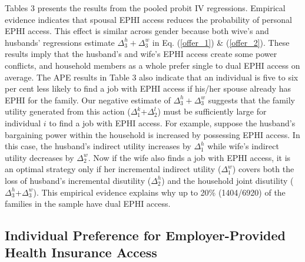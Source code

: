 \documentclass[legno,11pt]{article}
\begin{document}
Tables 3 presents the results from the pooled probit IV regressions.
Empirical evidence indicates that spousal EPHI access reduces the
probability of personal EPHI access. This effect is similar across
gender because both wive's and husbands' regressions estimate
$\Delta_{3}^{h}+\Delta_{3}^{w}$ in  Eq. (\ref{offer_1}) \&
(\ref{offer_2}). These results imply that the husband's and wife's
EPHI access create some power conflicts, and household members as a
whole prefer single to dual EPHI access on average. The APE results
in Table 3 also indicate that an individual is five to six per cent
less likely to find a job with EPHI access if his/her spouse already
has EPHI for the family. Our negative estimate of
$\Delta_{3}^{h}+\Delta_{3}^{w}$ suggests that the family utility
generated from this action ($\Delta_{1}^{k}$+$\Delta_{2}^{l}$) must
be sufficiently large for individual $i$ to find a job with EPHI
access. For example, suppose the husband's bargaining power within
the household is increased by possessing EPHI access. In this case,
the husband's indirect utility increases by $\Delta^{h}_{1}$ while
wife's indirect utility decreases by $\Delta^{w}_{2}$. Now if the
wife also finds a job with EPHI access, it is an optimal strategy
only if her incremental indirect utility ($\Delta^{w}_{1}$) covers
both the loss of husband's incremental disutility ($\Delta^{h}_{2}$)
and the household joint disutility
($\Delta^{h}_{3}$+$\Delta^{w}_{3}$). This empirical evidence
explains why up to 20\% (1404/6920) of the families in the sample
have dual EPHI access.\par

\subsection{Individual Preference for Employer-Provided Health Insurance Access}
\end{document}
